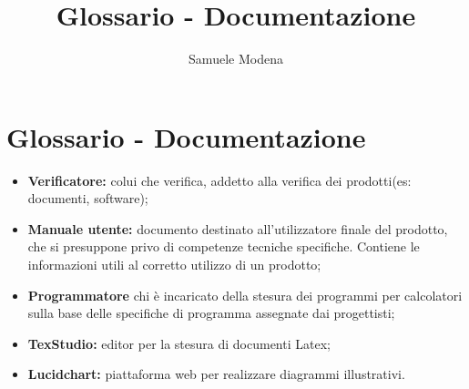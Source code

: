 \documentclass[openany,12pt,a4paper]{report}
\title{Glossario - Documentazione}
\author{Samuele Modena}
\begin{document}
\chapter{Glossario - Documentazione}

\begin{itemize}
    \item{\textbf{Verificatore:}} colui che verifica, addetto alla verifica dei prodotti(es: documenti, software); 
	\item{\textbf{Manuale utente:}} documento destinato all'utilizzatore finale del prodotto, che si presuppone privo di competenze tecniche specifiche. Contiene le informazioni utili al corretto utilizzo di un prodotto;
	\item{\textbf{Programmatore}} chi è incaricato della stesura dei programmi per calcolatori sulla base delle specifiche di programma assegnate dai progettisti;
	\item{\textbf{TexStudio:}} editor per la stesura di documenti Latex;
	\item{\textbf{Lucidchart:}} piattaforma web per realizzare diagrammi illustrativi.
\end{itemize}
\end{document}
